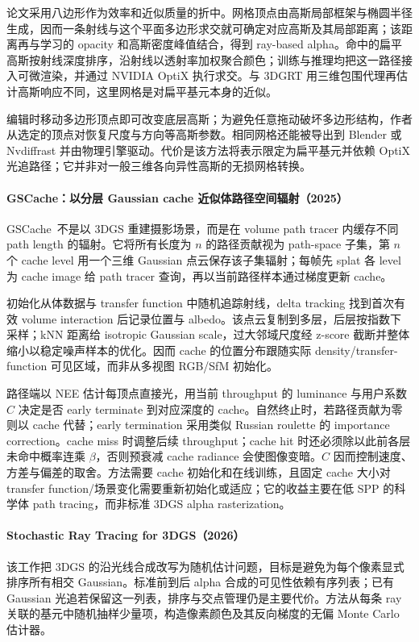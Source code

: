 论文采用八边形作为效率和近似质量的折中。网格顶点由高斯局部框架与椭圆半径生成，因而一条射线与这个平面多边形求交就可确定对应高斯及其局部距离；该距离再与学习的 opacity 和高斯密度峰值结合，得到 ray-based alpha。命中的扁平高斯按射线深度排序，沿射线以透射率加权聚合颜色；训练与推理均把这一路径接入可微渲染，并通过 NVIDIA OptiX 执行求交。与 3DGRT 用三维包围代理再估计高斯响应不同，这里网格是对扁平基元本身的近似。

编辑时移动多边形顶点即可改变底层高斯；为避免任意拖动破坏多边形结构，作者从选定的顶点对恢复尺度与方向等高斯参数。相同网格还能被导出到 Blender 或 Nvdiffrast 并由物理引擎驱动。代价是该方法将表示限定为扁平基元并依赖 OptiX 光追路径；它并非对一般三维各向异性高斯的无损网格转换。

\paragraph{GSCache：以分层 Gaussian cache 近似体路径空间辐射（2025）\cite{2507_19718}}
GSCache~\cite{2507_19718}不是以 3DGS 重建摄影场景，而是在 volume path tracer 内缓存不同 path length 的辐射。它将所有长度为 $n$ 的路径贡献视为 path-space 子集，第 $n$ 个 cache level 用一个三维 Gaussian 点云保存该子集辐射；每帧先 splat 各 level 为 cache image 给 path tracer 查询，再以当前路径样本通过梯度更新 cache。

初始化从体数据与 transfer function 中随机追踪射线，delta tracking 找到首次有效 volume interaction 后记录位置与 albedo。该点云复制到多层，后层按指数下采样；kNN 距离给 isotropic Gaussian scale，过大邻域尺度经 z-score 截断并整体缩小以稳定噪声样本的优化。因而 cache 的位置分布跟随实际 density/transfer-function 可见区域，而非从多视图 RGB/SfM 初始化。

路径端以 NEE 估计每顶点直接光，用当前 throughput 的 luminance 与用户系数 $C$ 决定是否 early terminate 到对应深度的 cache。自然终止时，若路径贡献为零则以 cache 代替；early termination 采用类似 Russian roulette 的 importance correction。cache miss 时调整后续 throughput；cache hit 时还必须除以此前各层未命中概率连乘 $\beta$，否则预衰减 cache radiance 会使图像变暗。$C$ 因而控制速度、方差与偏差的取舍。方法需要 cache 初始化和在线训练，且固定 cache 大小对 transfer function/场景变化需要重新初始化或适应；它的收益主要在低 SPP 的科学体 path tracing，而非标准 3DGS alpha rasterization。

\paragraph{Stochastic Ray Tracing for 3DGS（2026）\cite{2603_23637}}
该工作把 3DGS 的沿光线合成改写为随机估计问题，目标是避免为每个像素显式排序所有相交 Gaussian。标准前到后 alpha 合成的可见性依赖有序列表；已有 Gaussian 光追若保留这一列表，排序与交点管理仍是主要代价。方法从每条 ray 关联的基元中随机抽样少量项，构造像素颜色及其反向梯度的无偏 Monte Carlo 估计器。

